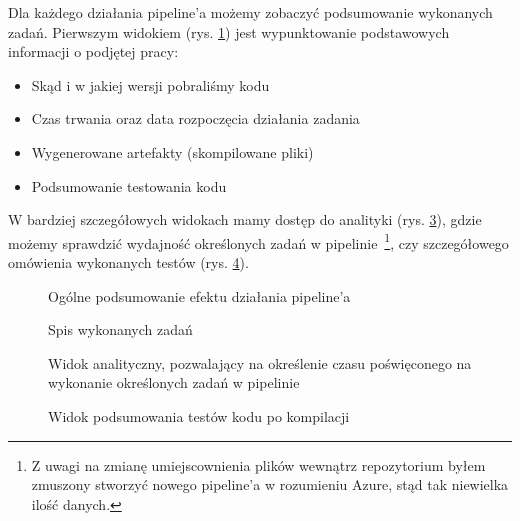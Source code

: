 Dla każdego działania pipeline'a możemy zobaczyć podsumowanie wykonanych zadań.
Pierwszym widokiem (rys. \ref{img:runSummary}) jest wypunktowanie podstawowych informacji o podjętej pracy:
\begin{itemize}
    \item Skąd i w jakiej wersji pobraliśmy kodu
    \item Czas trwania oraz data rozpoczęcia działania zadania
    \item Wygenerowane artefakty (skompilowane pliki)
    \item Podsumowanie testowania kodu
\end{itemize}

W bardziej szczegółowych widokach mamy dostęp do analityki (rys. \ref{img:pipelineAnalytics}), 
gdzie możemy sprawdzić wydajność określonych zadań w pipelinie~\footnote{%
    Z uwagi na zmianę umiejscownienia plików wewnątrz repozytorium byłem zmuszony stworzyć 
    nowego pipeline'a w rozumieniu Azure, stąd tak niewielka ilość danych.
}, czy szczegółowego omówienia wykonanych testów (rys. \ref{img:testCoverage}).

\newpage
{}
\begin{figure}[!ht]
    \centering
    \caption{Ogólne podsumowanie efektu działania pipeline'a}
    \label{img:runSummary}
\end{figure}

\begin{figure}[!ht]
    \centering
    \caption{Spis wykonanych zadań}
    \label{img:stagesOverview}
\end{figure}

\begin{figure}[!ht]
    \centering
    \noindent{}
    \caption{Widok analityczny, pozwalający na określenie czasu poświęconego na wykonanie
        określonych zadań w pipelinie}
    \label{img:pipelineAnalytics}
\end{figure}


\begin{figure}[!hb]
    \centering
    \noindent{}
    \caption{Widok podsumowania testów kodu po kompilacji}
    \label{img:testCoverage}
\end{figure}

\restoregeometry
